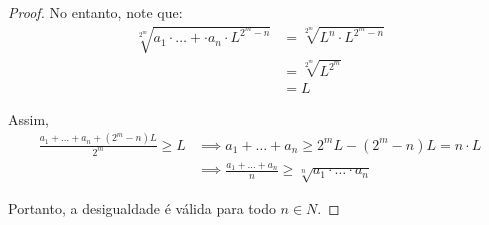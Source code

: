 \begin{proof}
	No entanto, note que:
	\begin{align*}
		\sqrt[2^m]{a_1 \cdot \ldots +\cdot a_n \cdot L^{2^m-n}} & = \sqrt[2^m]{L^n \cdot L^{2^m-n}} \\ & = \sqrt[2^m]{L^{2^m}} \\ & = L
	\end{align*}
	
	Assim,
	\begin{align*}
		\frac{a_1 + \ldots + a_n + (2^m - n)L}{2^m} \ge L & \implies a_1 + \ldots + a_n \ge 2^m L - (2^m - n)L = n \cdot L\\
		& \implies \frac{a_1 + \ldots + a_n}{n} \ge \sqrt[n]{a_1 \cdot \ldots \cdot a_n}
	\end{align*}

	Portanto, a desigualdade é válida para todo $n \in N$.
\end{proof}